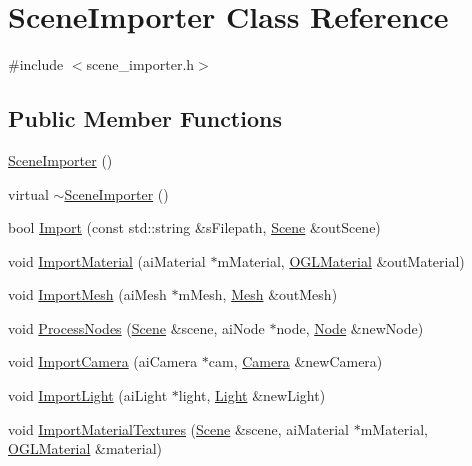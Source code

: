 \hypertarget{class_scene_importer}{}\section{Scene\+Importer Class Reference}
\label{class_scene_importer}


{\ttfamily \#include $<$scene\+\_\+importer.\+h$>$}

\subsection*{Public Member Functions}
\begin{DoxyCompactItemize}
\item 
\hyperlink{class_scene_importer_a201f250b66f3624b837bb872f2eb272e}{Scene\+Importer} ()
\item 
virtual \hyperlink{class_scene_importer_a3bb4c596b51053e34370c5009938d534}{$\sim$\+Scene\+Importer} ()
\item 
bool \hyperlink{class_scene_importer_aa4b1315cdf2e58135500d479131305fa}{Import} (const std\+::string \&s\+Filepath, \hyperlink{class_scene}{Scene} \&out\+Scene)
\item 
void \hyperlink{class_scene_importer_ae272a120269dda37b7d2e845845a3ddc}{Import\+Material} (ai\+Material $\ast$m\+Material, \hyperlink{class_o_g_l_material}{O\+G\+L\+Material} \&out\+Material)
\item 
void \hyperlink{class_scene_importer_a21f1cde30e9ae58326436924b0bee0dc}{Import\+Mesh} (ai\+Mesh $\ast$m\+Mesh, \hyperlink{class_mesh}{Mesh} \&out\+Mesh)
\item 
void \hyperlink{class_scene_importer_a01e7d7db526210110b5bbc46505e749b}{Process\+Nodes} (\hyperlink{class_scene}{Scene} \&scene, ai\+Node $\ast$node, \hyperlink{class_node}{Node} \&new\+Node)
\item 
void \hyperlink{class_scene_importer_a25591047cda928aac6b639981709e3bf}{Import\+Camera} (ai\+Camera $\ast$cam, \hyperlink{class_camera}{Camera} \&new\+Camera)
\item 
void \hyperlink{class_scene_importer_a40f4be6c5694543678fd657b711067c0}{Import\+Light} (ai\+Light $\ast$light, \hyperlink{class_light}{Light} \&new\+Light)
\item 
void \hyperlink{class_scene_importer_a285bb8c6e758916d672451e386c477ea}{Import\+Material\+Textures} (\hyperlink{class_scene}{Scene} \&scene, ai\+Material $\ast$m\+Material, \hyperlink{class_o_g_l_material}{O\+G\+L\+Material} \&material)
\end{DoxyCompactItemize}


